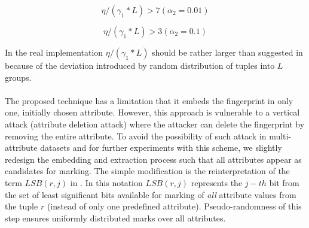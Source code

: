 \begin{equation}\label{eq:extraction-99}
    \eta/(\gamma_1 * L) > 7 (\alpha_2=0.01)
\end{equation}

\begin{equation}\label{eq:extraction-90}
    \eta/(\gamma_1 * L) > 3 (\alpha_2=0.1)
\end{equation}

In the real implementation $\eta/(\gamma_1 * L)$ should be rather larger than suggested in  because of the deviation introduced by random distribution of tuples into $L$ groups. 

\paragraph{}
The proposed technique has a limitation that it embeds the fingerprint in only one, initially chosen attribute. 
However, this approach is vulnerable to a vertical attack (attribute deletion attack) where the attacker can delete the fingerprint by removing the entire attribute. 
To avoid the possibility of such attack in multi-attribute datasets and for further experiments with this scheme, we slightly redesign the embedding and extraction process such that all attributes appear as candidates for marking. 
The simple modification is the reinterpretation of the term $LSB(r,j)$ in .
In this notation $LSB(r,j)$ represents the $j-th$ bit from the set of least significant bits available for marking of \textit{all} attribute values from the tuple $r$ (instead of only one predefined attribute).
Pseudo-randomness of this step ensures uniformly distributed marks over all attributes. 

